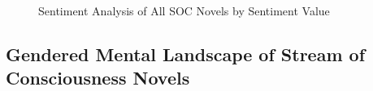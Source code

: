 \documentclass[
  letterpaper,
  DIV=11,
  numbers=noendperiod]{scrartcl}
\begin{document}
\begin{figure}


\caption{\label{fig-sentiment-number}Sentiment Analysis of All SOC
Novels by Sentiment Value}

\end{figure}%

\subsection{Gendered Mental Landscape of Stream of Consciousness
Novels}\label{gendered-mental-landscape-of-stream-of-consciousness-novels}
\end{document}
